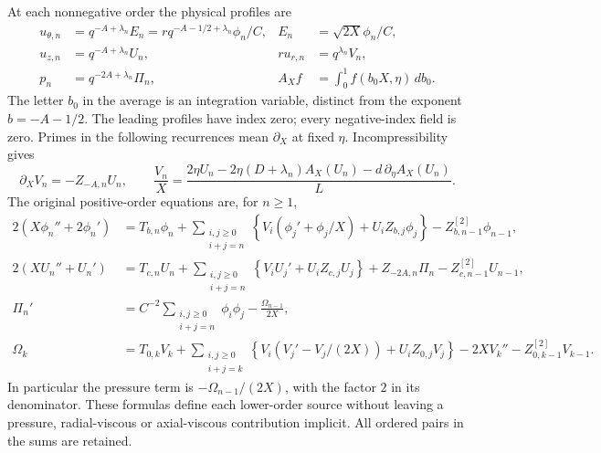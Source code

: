 At each nonnegative order the physical profiles are
\begin{equation}
\begin{aligned}
 u_{\theta,n}
  &=q^{-A+\lambda_n}E_n
    =r q^{-A-1/2+\lambda_n}\phi_n/C,
 &E_n&=\sqrt{2X}\phi_n/C,\\
 u_{z,n}&=q^{-A+\lambda_n}U_n,
 &r u_{r,n}&=q^{\lambda_n}V_n,\\
 p_n&=q^{-2A+\lambda_n}\Pi_n,
 &A_Xf&=\int_0^1 f(b_0X,\eta)\,db_0 .
\end{aligned}
 \label{eq:cq-source-physical-coefficients}
\end{equation}
The letter $b_0$ in the average is an integration variable,
distinct from the exponent $b=-A-1/2$.
The leading profiles have index zero; every negative-index
field is zero. Primes in the following recurrences mean
$\partial_X$ at fixed $\eta$. Incompressibility gives
\begin{equation}
 \partial_XV_n=-Z_{-A,n}U_n,\qquad
 \frac{V_n}{X}=
 \frac{2\eta U_n-2\eta(D+\lambda_n)A_X(U_n)
                      -d\,\partial_\eta A_X(U_n)}L .
 \label{eq:cq-source-full-incompressibility-recurrence}
\end{equation}
The original positive-order equations are, for $n\geq1$,
\begin{align}
 2(X\phi_n''+2\phi_n')
 &=T_{b,n}\phi_n+
   \sum_{\substack{i,j\geq0\\i+j=n}}
    \left\{V_i(\phi_j'+\phi_j/X)+U_iZ_{b,j}\phi_j\right\}
                         -Z^{[2]}_{b,n-1}\phi_{n-1},
 \label{eq:cq-source-full-angular-recurrence}\\
 2(XU_n''+U_n')
 &=T_{c,n}U_n+
   \sum_{\substack{i,j\geq0\\i+j=n}}
           \left\{V_iU_j'+U_iZ_{c,j}U_j\right\}
   +Z_{-2A,n}\Pi_n-Z^{[2]}_{c,n-1}U_{n-1},
 \label{eq:cq-source-full-axial-recurrence}\\
 \Pi_n'
 &=C^{-2}\sum_{\substack{i,j\geq0\\i+j=n}}\phi_i\phi_j
                          -\frac{\Omega_{n-1}}{2X},
 \label{eq:cq-source-full-pressure-recurrence}\\
 \Omega_k
 &=T_{0,k}V_k+
   \sum_{\substack{i,j\geq0\\i+j=k}}
       \left\{V_i(V_j'-V_j/(2X))+U_iZ_{0,j}V_j\right\}
             -2XV_k''-Z^{[2]}_{0,k-1}V_{k-1}.
 \label{eq:cq-source-full-radial-recurrence}
\end{align}
In particular the pressure term is
$-\Omega_{n-1}/(2X)$, with the factor $2$ in its denominator.
These formulas define each lower-order source without leaving
a pressure, radial-viscous or axial-viscous contribution
implicit. All ordered pairs in the sums are retained.

